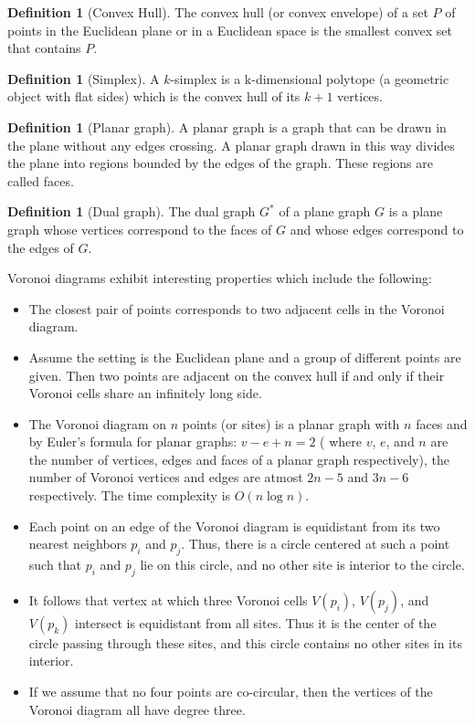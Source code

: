 \documentclass[10pt,a4paper]{article}
\theoremstyle{plain}
\theoremstyle{definition}
\newtheorem{defn}[subsection]{Definition}
\begin{document}
      \begin{defn}[Convex Hull]
      	The convex hull (or convex envelope) of a set $P$ of points in the Euclidean plane or in a Euclidean space is the smallest convex set that contains $P$.\\
      \end{defn}
       \begin{defn}[Simplex]
       	A $k$-simplex is a k-dimensional polytope (a geometric object with flat sides) which is the convex hull of its $k+1$ vertices.\\
       \end{defn}
       \begin{defn}[Planar graph]
       	A planar graph is a graph that can be drawn in the plane without any edges crossing. A planar graph drawn in this way divides the plane into regions bounded by the edges of the graph. These regions are called faces. \\
       \end{defn} 
       \begin{defn}[Dual graph]
       	The dual graph $G^*$ of a plane graph $G$ is a plane graph whose vertices correspond to the faces of $G$ and whose edges correspond to the edges of $G$.\\
       \end{defn}
      
      Voronoi diagrams exhibit interesting properties which include the following:
      \begin{itemize}
      	\item The closest pair of points corresponds to two adjacent cells in the Voronoi diagram.
      	\item Assume the setting is the Euclidean plane and a group of different points are given. Then two points are adjacent on the convex hull if and only if their Voronoi cells share an infinitely long side.
      	\item The Voronoi diagram on $n$ points (or sites) is a planar graph with $n$ faces and by Euler's formula for planar graphs: $v-e+n=2$ ( where $v$, $e$, and $n$ are the number of vertices, edges and faces of a planar graph respectively), the number of Voronoi vertices and edges are atmost $2n-5$ and $3n-6$ respectively. The time complexity is $O(n \log{n})$.
      	\item Each point on an edge of the Voronoi diagram is equidistant from its two nearest neighbors $p_i$ and $p_j$. Thus, there is a circle centered at such a point such that $p_i$ and $p_j$ lie
      	on this circle, and no other site is interior to the circle.
      	\item It follows that vertex at which three Voronoi cells $V(p_i)$, $V(p_j)$, and $V(p_k)$ intersect is equidistant from all sites. Thus it is the center of the circle passing through these sites, and this circle contains no other sites in its interior.
      	\item If we assume that no four points are co-circular, then the vertices of the Voronoi diagram all have degree three.
      	
      \end{itemize}
  
\end{document}
